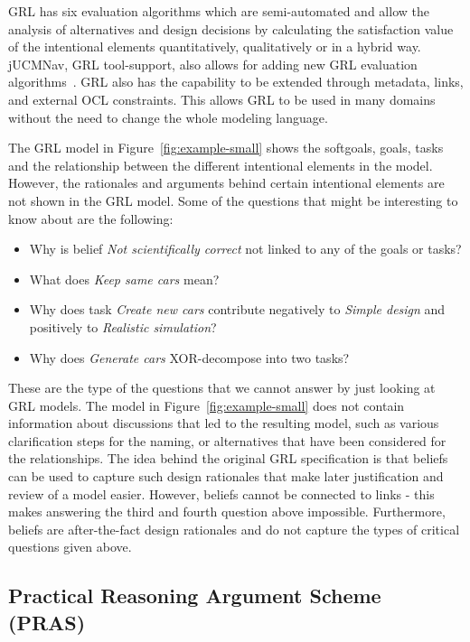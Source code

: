 GRL has six evaluation algorithms which are semi-automated and allow the analysis of alternatives and design decisions by calculating the satisfaction value of the intentional elements quantitatively, qualitatively or in a hybrid way. jUCMNav, GRL tool-support, also allows for adding new GRL evaluation algorithms~\cite{jUCMNav}. GRL also has the capability to be extended through metadata, links, and external OCL constraints. This allows GRL to be used in many domains without the need to change the whole modeling language. 

The GRL model in Figure~\ref{fig:example-small} shows the softgoals, goals, tasks and the relationship between the different intentional elements in the model. However, the rationales and arguments behind certain intentional elements are not shown in the GRL model. Some of the questions that might be interesting to know about are the following:

\begin{itemize}
	\item Why is belief \emph{Not scientifically correct} not linked to any of the goals or tasks? 
	\item What does \emph{Keep same cars} mean?
	\item Why does task \emph{Create new cars} contribute negatively to \emph{Simple design} and positively to \emph{Realistic simulation}?
	\item Why does \emph{Generate cars} XOR-decompose into two tasks?
\end{itemize}

These are the type of the questions that we cannot answer by just looking at GRL models. The model in Figure~\ref{fig:example-small} does not contain information about discussions that led to the resulting model, such as various clarification steps for the naming, or alternatives that have been considered for the relationships. The idea behind the original GRL specification is that beliefs can be used to capture such design rationales that make later justification and review of a model easier. However, beliefs cannot be connected to links - this makes answering the third and fourth question above impossible. Furthermore, beliefs are after-the-fact design rationales and do not capture the types of critical questions given above. 

\subsection{Practical Reasoning Argument Scheme (PRAS)}
\label{sect:background:pras}

